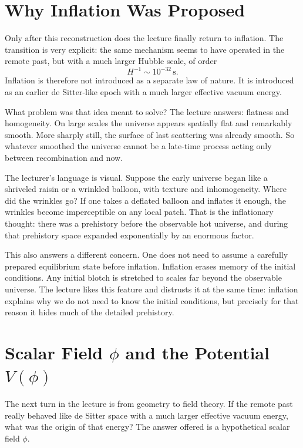 \section{Why Inflation Was Proposed}

Only after this reconstruction does the lecture finally return to inflation. The transition is very explicit: the same mechanism seems to have operated in the remote past, but with a much larger Hubble scale, of order
\begin{equation}
H^{-1}\sim 10^{-32}\,\mathrm{s}.
\end{equation}
Inflation is therefore not introduced as a separate law of nature. It is introduced as an earlier de Sitter-like epoch with a much larger effective vacuum energy.

What problem was that idea meant to solve? The lecture answers: flatness and homogeneity. On large scales the universe appears spatially flat and remarkably smooth. More sharply still, the surface of last scattering was already smooth. So whatever smoothed the universe cannot be a late-time process acting only between recombination and now.

The lecturer's language is visual. Suppose the early universe began like a shriveled raisin or a wrinkled balloon, with texture and inhomogeneity. Where did the wrinkles go? If one takes a deflated balloon and inflates it enough, the wrinkles become imperceptible on any local patch. That is the inflationary thought: there was a prehistory before the observable hot universe, and during that prehistory space expanded exponentially by an enormous factor.

This also answers a different concern. One does not need to assume a carefully prepared equilibrium state before inflation. Inflation erases memory of the initial conditions. Any initial blotch is stretched to scales far beyond the observable universe. The lecture likes this feature and distrusts it at the same time: inflation explains why we do not need to know the initial conditions, but precisely for that reason it hides much of the detailed prehistory.

\section{Scalar Field \(\phi\) and the Potential \(V(\phi)\)}

The next turn in the lecture is from geometry to field theory. If the remote past really behaved like de Sitter space with a much larger effective vacuum energy, what was the origin of that energy? The answer offered is a hypothetical scalar field \(\phi\).

